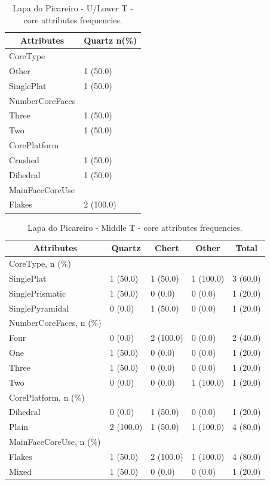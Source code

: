 \documentclass[12pt,twoside]{reedthesis}
\begin{document}
\newpage
\begin{table}[!h]

\caption{\label{tab:coreattributesLP1}Lapa do Picareiro - U/Lower T - core attributes frequencies.}
\centering
\fontsize{9}{11}\selectfont
\begin{tabular}[t]{ll}
\toprule
\multicolumn{1}{c}{\textbf{Attributes}} & \multicolumn{1}{c}{\textbf{Quartz n(\%)}}\\
\midrule
CoreType & \\
Other & 1 (50.0)\\
SinglePlat & 1 (50.0)\\
NumberCoreFaces & \\
Three & 1 (50.0)\\
\addlinespace
Two & 1 (50.0)\\
CorePlatform & \\
Crushed & 1 (50.0)\\
Dihedral & 1 (50.0)\\
MainFaceCoreUse & \\
\addlinespace
Flakes & 2 (100.0)\\
\bottomrule
\end{tabular}
\end{table}
\begin{table}[!h]

\caption{\label{tab:coreattributesLP2}Lapa do Picareiro - Middle T - core attributes frequencies.}
\centering
\fontsize{9}{11}\selectfont
\begin{tabular}[t]{lllll}
\toprule
\multicolumn{1}{c}{\textbf{Attributes}} & \multicolumn{1}{c}{\textbf{Quartz}} & \multicolumn{1}{c}{\textbf{Chert}} & \multicolumn{1}{c}{\textbf{Other}} & \multicolumn{1}{c}{\textbf{Total}}\\
\midrule
CoreType, n (\%) &  &  &  & \\
SinglePlat & 1 (50.0) & 1 (50.0) & 1 (100.0) & 3 (60.0)\\
SinglePrismatic & 1 (50.0) & 0 (0.0) & 0 (0.0) & 1 (20.0)\\
SinglePyramidal & 0 (0.0) & 1 (50.0) & 0 (0.0) & 1 (20.0)\\
NumberCoreFaces, n (\%) &  &  &  & \\
\addlinespace
Four & 0 (0.0) & 2 (100.0) & 0 (0.0) & 2 (40.0)\\
One & 1 (50.0) & 0 (0.0) & 0 (0.0) & 1 (20.0)\\
Three & 1 (50.0) & 0 (0.0) & 0 (0.0) & 1 (20.0)\\
Two & 0 (0.0) & 0 (0.0) & 1 (100.0) & 1 (20.0)\\
CorePlatform, n (\%) &  &  &  & \\
\addlinespace
Dihedral & 0 (0.0) & 1 (50.0) & 0 (0.0) & 1 (20.0)\\
Plain & 2 (100.0) & 1 (50.0) & 1 (100.0) & 4 (80.0)\\
MainFaceCoreUse, n (\%) &  &  &  & \\
Flakes & 1 (50.0) & 2 (100.0) & 1 (100.0) & 4 (80.0)\\
Mixed & 1 (50.0) & 0 (0.0) & 0 (0.0) & 1 (20.0)\\
\bottomrule
\end{tabular}
\end{table}
\end{document}
